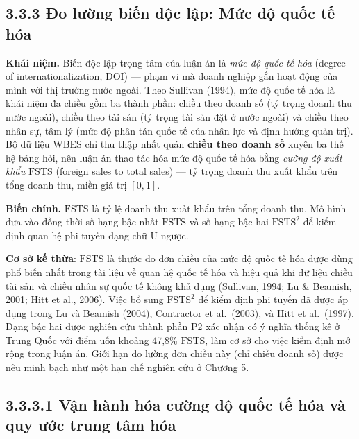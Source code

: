 \documentclass[
  a4paper,
  13pt]{extreport}
\begin{document}
\hypertarget{ux111o-lux1b0ux1eddng-biux1ebfn-ux111ux1ed9c-lux1eadp-mux1ee9c-ux111ux1ed9-quux1ed1c-tux1ebf-huxf3a}{%
\subsection{3.3.3 Đo lường biến độc lập: Mức độ quốc tế
hóa}\label{ux111o-lux1b0ux1eddng-biux1ebfn-ux111ux1ed9c-lux1eadp-mux1ee9c-ux111ux1ed9-quux1ed1c-tux1ebf-huxf3a}}

\textbf{Khái niệm.} Biến độc lập trọng tâm của luận án là \emph{mức độ
quốc tế hóa} (degree of internationalization, DOI) --- phạm vi mà doanh
nghiệp gắn hoạt động của mình với thị trường nước ngoài. Theo Sullivan
(1994), mức độ quốc tế hóa là khái niệm đa chiều gồm ba thành phần:
chiều theo doanh số (tỷ trọng doanh thu nước ngoài), chiều theo tài sản
(tỷ trọng tài sản đặt ở nước ngoài) và chiều theo nhân sự, tâm lý (mức
độ phân tán quốc tế của nhân lực và định hướng quản trị). Bộ dữ liệu
WBES chỉ thu thập nhất quán \textbf{chiều theo doanh số} xuyên ba thế hệ
bảng hỏi, nên luận án thao tác hóa mức độ quốc tế hóa bằng \emph{cường
độ xuất khẩu} \(\mathrm{FSTS}\) (foreign sales to total sales) --- tỷ
trọng doanh thu xuất khẩu trên tổng doanh thu, miền giá trị \([0,1]\).

\textbf{Biến chính.} \(\mathrm{FSTS}\) là tỷ lệ doanh thu xuất khẩu trên
tổng doanh thu. Mô hình đưa vào đồng thời số hạng bậc nhất
\(\mathrm{FSTS}\) và số hạng bậc hai \(\mathrm{FSTS}^{2}\) để kiểm định
quan hệ phi tuyến dạng chữ U ngược.

\textbf{Cơ sở kế thừa}: \(\mathrm{FSTS}\) là thước đo đơn chiều của mức
độ quốc tế hóa được dùng phổ biến nhất trong tài liệu về quan hệ quốc tế
hóa và hiệu quả khi dữ liệu chiều tài sản và chiều nhân sự quốc tế không
khả dụng (Sullivan, 1994; Lu \& Beamish, 2001; Hitt et al., 2006). Việc
bổ sung \(\mathrm{FSTS}^{2}\) để kiểm định phi tuyến đã được áp dụng
trong Lu và Beamish (2004), Contractor et al.~(2003), và Hitt et
al.~(1997). Dạng bậc hai được nghiên cứu thành phần P2 xác nhận có ý
nghĩa thống kê ở Trung Quốc với điểm uốn khoảng 47,8\%
\(\mathrm{FSTS}\), làm cơ sở cho việc kiểm định mở rộng trong luận án.
Giới hạn đo lường đơn chiều này (chỉ chiều doanh số) được nêu minh bạch
như một hạn chế nghiên cứu ở Chương 5.

\hypertarget{vux1eadn-huxe0nh-huxf3a-cux1b0ux1eddng-ux111ux1ed9-quux1ed1c-tux1ebf-huxf3a-vuxe0-quy-ux1b0ux1edbc-trung-tuxe2m-huxf3a}{%
\subsection{3.3.3.1 Vận hành hóa cường độ quốc tế hóa và quy ước trung
tâm
hóa}\label{vux1eadn-huxe0nh-huxf3a-cux1b0ux1eddng-ux111ux1ed9-quux1ed1c-tux1ebf-huxf3a-vuxe0-quy-ux1b0ux1edbc-trung-tuxe2m-huxf3a}}
\end{document}
